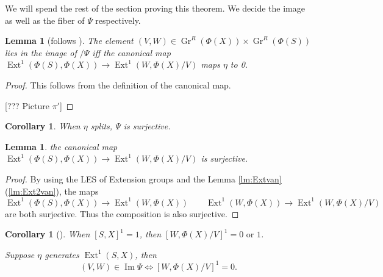 \documentclass[reqno,11pt]{amsart}
\numberwithin{equation}{section}
\theoremstyle{plain}
\newtheorem{lemma}[theorem]{Lemma}
\newtheorem{corollary}[theorem]{Corollary}
\theoremstyle{plain}
\numberwithin{equation}{section}
\theoremstyle{remark}
\DeclareMathOperator{\Img}{\operatorname{Im}}
\DeclareMathOperator{\Ext}{\operatorname{Ext}}
\newcommand{\Grr}{\operatorname{Gr}^{R}}
\begin{document}
We will spend the rest of the section proving this theorem. We decide the image as well as the fiber of $\Psi$ respectively.
\begin{lemma}[follows {\cite[Lemma 21]{irelli2019cell}}]
The element $(V,W) \in \Grr(\Phi(X)) \times \Grr(\Phi(S))$ lies in the image of $/\Psi$ iff the canonical map $\Ext^1(\Phi(S),\Phi(X)) \longrightarrow \Ext^1(W,\Phi(X)/V)$ maps $\eta$ to 0.
\end{lemma}
\begin{proof}
	This follows from the definition of the canonical map.
	
	[??? Picture $\pi'$]
\end{proof}
\begin{corollary}
	When $\eta$ splits, $\Psi$ is surjective.
\end{corollary}
\begin{lemma}
	the canonical map $\Ext^1(\Phi(S),\Phi(X)) \longrightarrow \Ext^1(W,\Phi(X)/V)$ is surjective.
\end{lemma}
\begin{proof}
	By using the LES of Extension groups and the Lemma \ref{lm:Extvan}(\ref{lm:Ext2van}), the maps
	$$\Ext^1(\Phi(S),\Phi(X)) \longrightarrow \Ext^1(W,\Phi(X))\qquad \Ext^1(W,\Phi(X)) \longrightarrow \Ext^1(W,\Phi(X)/V)$$
	are both surjective. Thus the composition is also surjective.
\end{proof}
\begin{corollary}[]\label{cor:0or1}
	When $[S,X]^1=1$, then $[W,\Phi(X)/V]^1=0 \text{ or }1$.
	
	Suppose $\eta$ generates $\Ext^1(S,X)$, then 
	$$(V,W) \in \Img \Psi \iff [W,\Phi(X)/V]^1=0.$$
\end{corollary}
\end{document}
